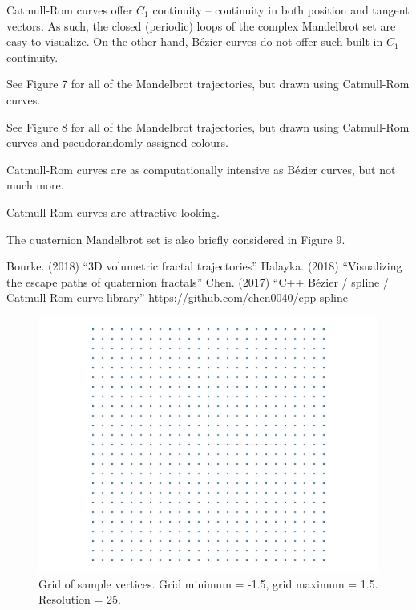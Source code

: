 \documentclass[12pt]{article}
\begin{document}
Catmull-Rom curves offer $C_1$ continuity -- continuity in both position and tangent vectors.
As such, the closed (periodic) loops of the complex Mandelbrot set are easy to visualize.
On the other hand, B\'ezier curves do not offer such built-in $C_1$ continuity.

See Figure 7 for all of the Mandelbrot trajectories, but drawn using Catmull-Rom curves.

See Figure 8 for all of the Mandelbrot trajectories, but drawn using Catmull-Rom curves and pseudorandomly-assigned colours.

Catmull-Rom curves are as computationally intensive as B\'ezier curves, but not much more.

Catmull-Rom curves are attractive-looking.

The quaternion Mandelbrot set is also briefly considered in Figure 9.










\begin{thebibliography}{9}
 Bourke. (2018) ``3D volumetric fractal trajectories''
 Halayka. (2018) ``Visualizing the escape paths of quaternion fractals''
 Chen. (2017) ``C++ B\'ezier / spline / Catmull-Rom curve library'' \linebreak \url{https://github.com/chen0040/cpp-spline}

\end{thebibliography}



\pagebreak

\begin{figure} 
\centering
  \includegraphics[width = 5 in]{grid.png}	
  \caption{Grid of sample vertices.
Grid minimum = -1.5, grid maximum = 1.5.
Resolution = 25.
}
\end{figure}
\end{document}
